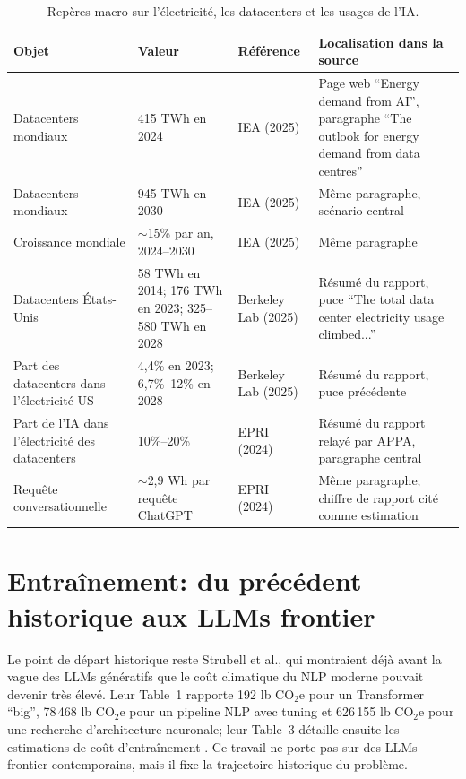 \documentclass[11pt,a4paper]{article}
\begin{document}
\begin{table}[htbp]
\centering
\begin{tabularx}{\textwidth}{|L{3.4cm}|L{2.4cm}|Y|Y|}
\hline
Objet & Valeur & Référence & Localisation dans la source \\
\hline
Datacenters mondiaux & 415 TWh en 2024 & IEA (2025) \cite{iea2025} & Page web ``Energy demand from AI'', paragraphe ``The outlook for energy demand from data centres'' \\
\hline
Datacenters mondiaux & 945 TWh en 2030 & IEA (2025) \cite{iea2025} & Même paragraphe, scénario central \\
\hline
Croissance mondiale & $\sim$15\% par an, 2024--2030 & IEA (2025) \cite{iea2025} & Même paragraphe \\
\hline
Datacenters États-Unis & 58 TWh en 2014; 176 TWh en 2023; 325--580 TWh en 2028 & Berkeley Lab (2025) \cite{lbl2025} & Résumé du rapport, puce ``The total data center electricity usage climbed...'' \\
\hline
Part des datacenters dans l'électricité US & 4,4\% en 2023; 6,7\%--12\% en 2028 & Berkeley Lab (2025) \cite{lbl2025} & Résumé du rapport, puce précédente \\
\hline
Part de l'IA dans l'électricité des datacenters & 10\%--20\% & EPRI (2024) \cite{epri2024} & Résumé du rapport relayé par APPA, paragraphe central \\
\hline
Requête conversationnelle & $\sim$2,9 Wh par requête ChatGPT & EPRI (2024) \cite{epri2024} & Même paragraphe; chiffre de rapport cité comme estimation \\
\hline
\end{tabularx}
\caption{Repères macro sur l'électricité, les datacenters et les usages de l'IA.}
\label{tab:macro}
\end{table}

\section{Entraînement: du précédent historique aux LLMs frontier}
Le point de départ historique reste Strubell et al., qui montraient déjà avant la vague des LLMs génératifs que le coût climatique du NLP moderne pouvait devenir très élevé. Leur Table~1 rapporte 192 lb CO$_2$e pour un Transformer ``big'', 78\,468 lb CO$_2$e pour un pipeline NLP avec tuning et 626\,155 lb CO$_2$e pour une recherche d'architecture neuronale; leur Table~3 détaille ensuite les estimations de coût d'entraînement \cite{strubell2019}. Ce travail ne porte pas sur des LLMs frontier contemporains, mais il fixe la trajectoire historique du problème.
\end{document}
